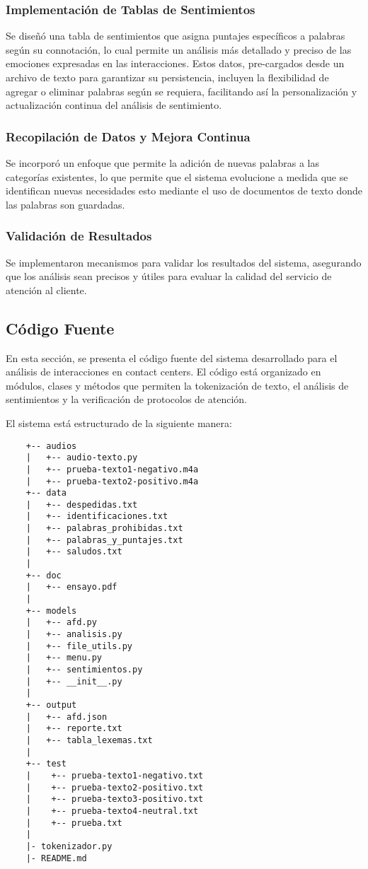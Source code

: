 \documentclass[12pt,a4paper]{article}
\begin{document}
\subsubsection{Implementación de Tablas de Sentimientos}
Se diseñó una tabla de sentimientos que asigna puntajes específicos a palabras según su connotación, lo cual permite un análisis más detallado y preciso de las emociones expresadas en las interacciones. Estos datos, pre-cargados desde un archivo de texto para garantizar su persistencia, incluyen la flexibilidad de agregar o eliminar palabras según se requiera, facilitando así la personalización y actualización continua del análisis de sentimiento.

\subsubsection{Recopilación de Datos y Mejora Continua}
Se incorporó un enfoque que permite la adición de nuevas palabras a las categorías existentes, lo que permite que el sistema evolucione a medida que se identifican nuevas necesidades esto mediante el uso de documentos de texto donde las palabras son guardadas.

\subsubsection{Validación de Resultados}
Se implementaron mecanismos para validar los resultados del sistema, asegurando que los análisis sean precisos y útiles para evaluar la calidad del servicio de atención al cliente.
\newpage
\subsection{Código Fuente}
En esta sección, se presenta el código fuente del sistema desarrollado para el análisis de interacciones en contact centers. El código está organizado en módulos, clases y métodos que permiten la tokenización de texto, el análisis de sentimientos y la verificación de protocolos de atención.

El sistema está estructurado de la siguiente manera:
\begin{tcolorbox}[colback=gray!10, colframe=gray!80, sharp corners, boxrule=0.5pt]
\begin{verbatim}
    +-- audios
    |   +-- audio-texto.py
    |   +-- prueba-texto1-negativo.m4a
    |   +-- prueba-texto2-positivo.m4a
    +-- data
    |   +-- despedidas.txt
    |   +-- identificaciones.txt
    |   +-- palabras_prohibidas.txt
    |   +-- palabras_y_puntajes.txt
    |   +-- saludos.txt
    |
    +-- doc
    |   +-- ensayo.pdf
    |
    +-- models
    |   +-- afd.py
    |   +-- analisis.py
    |   +-- file_utils.py
    |   +-- menu.py
    |   +-- sentimientos.py
    |   +-- __init__.py
    |
    +-- output
    |   +-- afd.json
    |   +-- reporte.txt
    |   +-- tabla_lexemas.txt
    |
    +-- test
    |    +-- prueba-texto1-negativo.txt
    |    +-- prueba-texto2-positivo.txt
    |    +-- prueba-texto3-positivo.txt
    |    +-- prueba-texto4-neutral.txt
    |    +-- prueba.txt
    |
    |- tokenizador.py
    |- README.md

\end{verbatim}
\end{tcolorbox}
\newpage
\end{document}
